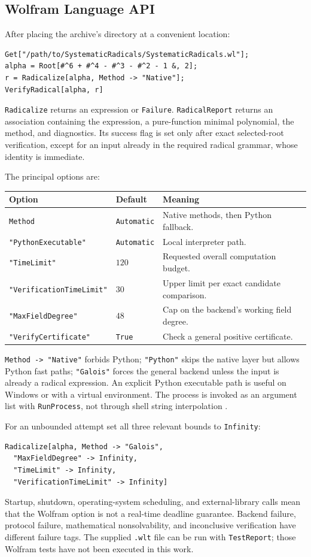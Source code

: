 \documentclass[11pt,a4paper]{article}
\theoremstyle{definition}
\theoremstyle{remark}
\newcommand{\code}[1]{\texttt{#1}}
\begin{document}
\subsection{Wolfram Language API}
After placing the archive's directory at a convenient location:
\begin{lstlisting}
Get["/path/to/SystematicRadicals/SystematicRadicals.wl"];
alpha = Root[#^6 + #^4 - #^3 - #^2 - 1 &, 2];
r = Radicalize[alpha, Method -> "Native"];
VerifyRadical[alpha, r]
\end{lstlisting}
\code{Radicalize} returns an expression or \code{Failure}. \code{RadicalReport}
returns an association containing the expression, a pure-function minimal
polynomial, the method, and diagnostics. Its success flag is set only after
exact selected-root verification, except for an input already in the required
radical grammar, whose identity is immediate.

The principal options are:
\begin{center}\small
\begin{tabular}{@{}p{}p{}p{}@{}}
\toprule
Option & Default & Meaning\\
\midrule
\code{Method} & \code{Automatic} & Native methods, then Python fallback.\\
\code{"PythonExecutable"} & \code{Automatic} & Local interpreter path.\\
\code{"TimeLimit"} & $120$ & Requested overall computation budget.\\
\code{"VerificationTimeLimit"} & $30$ & Upper limit per exact candidate comparison.\\
\code{"MaxFieldDegree"} & $48$ & Cap on the backend's working field degree.\\
\code{"VerifyCertificate"} & \code{True} & Check a general positive certificate.\\
\bottomrule
\end{tabular}
\end{center}
\code{Method -> "Native"} forbids Python; \code{"Python"} skips the native
layer but allows Python fast paths; \code{"Galois"} forces the general backend
unless the input is already a radical expression.
An explicit Python executable path is useful on Windows or with a virtual
environment. The process is invoked as an argument list with \code{RunProcess},
not through shell string interpolation \cite{runprocess}.

For an unbounded attempt set all three relevant bounds to \code{Infinity}:
\begin{lstlisting}
Radicalize[alpha, Method -> "Galois",
  "MaxFieldDegree" -> Infinity,
  "TimeLimit" -> Infinity,
  "VerificationTimeLimit" -> Infinity]
\end{lstlisting}
Startup, shutdown, operating-system scheduling, and external-library calls mean
that the Wolfram option is not a real-time deadline guarantee. Backend failure,
protocol failure, mathematical nonsolvability, and inconclusive verification
have different failure tags. The supplied \code{.wlt} file can be run with
\code{TestReport}; those Wolfram tests have not been executed in this work.
\end{document}
